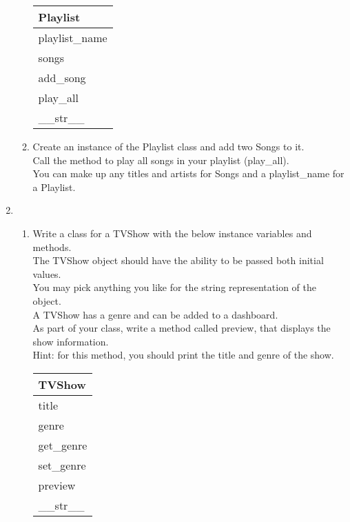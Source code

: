 \documentclass{article}
\begin{document}
\begin{enumerate}
\begin{enumerate}
			\begin{flushright}
			\begin{tabular}{|l|}
				\hline
				Playlist\\ \hline  	%
				playlist\_name \\ songs\\ \hline		%
				add\_song \\ play\_all \\ \_\_str\_\_ \\ \hline		%
			\end{tabular}
			\end{flushright}

		\item
			Create an instance of the Playlist class and add two Songs to it.\\
			Call the method to play all songs in your playlist (play\_all).\\
			You can make up any titles and artists for Songs and a playlist\_name for a Playlist.\\
	\end{enumerate}
\pagebreak



	\item
	\begin{enumerate}
		\item
			Write a class for a TVShow with the below instance variables and methods.\\ 
			The TVShow object should have the ability to be passed both initial values.\\  
			You may pick anything you like for the string representation of the object.\\
			A TVShow has a genre and can be added to a dashboard.\\  
			As part of your class, write a method called preview, that displays the show information.\\
			Hint: for this method, you should print the title and genre of the show.
			\begin{flushright}
			\begin{tabular}{|l|}
				\hline
				TVShow\\ \hline
				title \\	genre\\	 \hline
				get\_genre \\ set\_genre \\ preview \\ \_\_str\_\_ \\ \hline
			\end{tabular}
			\end{flushright}


\end{enumerate}
\end{enumerate}
\end{document}
